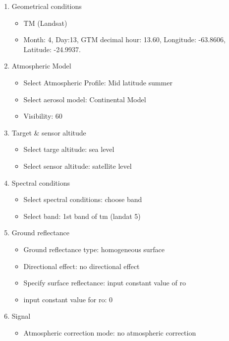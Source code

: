 \begin{enumerate}
    \item Geometrical conditions
        \begin{itemize}
            \item TM (Landsat)
            \item Month: 4, Day:13, GTM decimal hour: 13.60, Longitude:
                -63.8606, Latitude: -24.9937.
        \end{itemize}
    \item Atmospheric Model
        \begin{itemize}
            \item Select Atmospheric Profile: Mid latitude summer
            \item Select aerosol model: Continental Model
            \item Visibility: 60
        \end{itemize}
    \item Target \& sensor altitude
        \begin{itemize}
            \item Select targe altitude: sea level
            \item Select sensor altitude: satellite level
        \end{itemize}
    \item Spectral conditions
        \begin{itemize}
            \item Select spectral conditions: choose band
            \item Select band: 1st band of tm (landat 5)
        \end{itemize}
    \item Ground reflectance
        \begin{itemize}
            \item Ground reflectance type: homogeneous surface
            \item Directional effect: no directional effect
            \item Specify surface reflectance: input constant value of ro
            \item input constant value for ro: 0
        \end{itemize}
    \item Signal
        \begin{itemize}
            \item Atmospheric correction mode: no atmospheric correction
        \end{itemize}
\end{enumerate}

